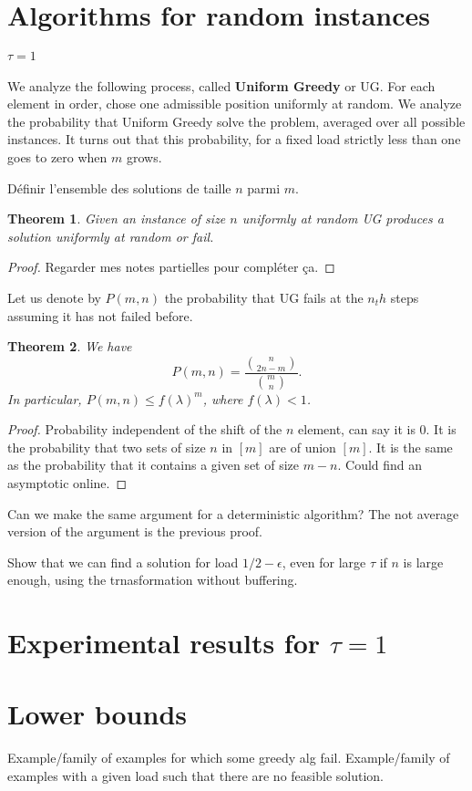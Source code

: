 \documentclass[10pt, conference, letterpaper]{IEEEtran}
\newtheorem{theorem}{Theorem}
\begin{document}
\section{Algorithms for random instances}

\paragraph{$\tau = 1$}

We analyze the following process, called \textbf{Uniform Greedy} or UG.
For each element in order, chose one admissible position
uniformly at random. We analyze the probability that Uniform Greedy
solve the problem, averaged over all possible instances. 
It turns out that this probability, for a fixed load strictly less than one goes to zero when $m$ grows. 

Définir l'ensemble des solutions de taille $n$ parmi $m$.
\begin{theorem}
Given an instance of size $n$ uniformly at random UG
produces a solution uniformly at random or fail.
\end{theorem}
\begin{proof}
Regarder mes notes partielles pour compléter ça.
\end{proof}

Let us denote by $P(m,n)$ the probability that UG fails at the $n_th$
steps assuming it has not failed before.

\begin{theorem}
We have $$P(m,n) = \frac{\binom{n}{2n-m}}{\binom{m}{n}}.$$
In particular, $P(m,n) \leq f(\lambda)^m$, where $f(\lambda) < 1$.
\end{theorem}
\begin{proof}
Probability independent of the shift of the $n$ element, can say it is $0$.
It is the probability that two sets of size $n$ in $[m]$ are of union $[m]$.
It is the same as the probability that it contains a given set of size $m-n$.
Could find an asymptotic online.
\end{proof}

Can we make the same argument for a deterministic algorithm?
The not average version of the argument is the previous proof.

Show that we can find a solution for load $1/2 - \epsilon$, even for large 
$\tau$ if $n$ is large enough, using the trnasformation without buffering.

\section{Experimental results for $\tau = 1$}


\section{Lower bounds}

Example/family of examples for which some greedy alg fail.
Example/family of examples with a given load such that there are no feasible solution.


 
\end{document}
